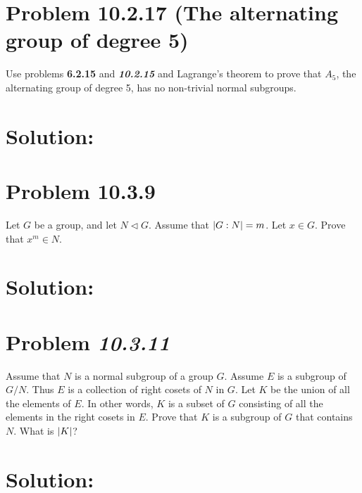 \documentclass{agstract}
\begin{document}

  \section*{Problem 10.2.17 (The alternating group of degree 5)}
    Use problems \textbf{6.2.15} and \textbf{\emph{10.2.15}} and
    Lagrange's theorem to prove that $A_5$, the alternating group of
    degree 5, has no non-trivial normal subgroups.

  \hrulefill

  \section*{Solution:}

  \clearpage


  \section*{Problem 10.3.9}
    Let $G$ be a group, and let $N \triangleleft G$. Assume that
    $\left| G : N \right| = m$. Let $x \in G$. Prove that $x^m \in N$.

  \hrulefill

  \section*{Solution:}

  \clearpage


  \section*{Problem \emph{10.3.11}}
    Assume that $N$ is a normal subgroup of a group $G$. Assume $E$ is
    a subgroup of $G/N$. Thus $E$ is a collection of right cosets of
    $N$ in $G$. Let $K$ be the union of all the elements of $E$. In
    other words, $K$ is a subset of $G$ consisting of all the elements
    in the right cosets in $E$. Prove that $K$ is a subgroup of $G$
    that contains $N$. What is $\left| K \right|$?

  \hrulefill

  \section*{Solution:}
\end{document}
